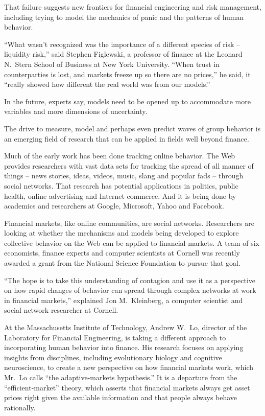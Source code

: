 ﻿\documentclass[12pt]{article}
\begin{document}
That failure suggests new frontiers for financial engineering and risk management, including trying
to model the mechanics of panic and the patterns of human behavior.

``What wasn't recognized was the importance of a different species of risk -- liquidity risk,'' said
Stephen Figlewski, a professor of finance at the Leonard N.~Stern School of Business at New York
University. ``When trust in counterparties is lost, and markets freeze up so there are no prices,''
he said, it ``really showed how different the real world was from our models.''

In the future, experts say, models need to be opened up to accommodate more variables and more
dimensions of uncertainty.

The drive to measure, model and perhaps even predict waves of group behavior is an emerging field of
research that can be applied in fields well beyond finance.

Much of the early work has been done tracking online behavior. The Web provides researchers with
vast data sets for tracking the spread of all manner of things -- news stories, ideas, videos,
music, slang and popular fads -- through social networks. That research has potential applications
in politics, public health, online advertising and Internet commerce. And it is being done by
academics and researchers at Google, Microsoft, Yahoo and Facebook.

Financial markets, like online communities, are social networks. Researchers are looking at whether
the mechanisms and models being developed to explore collective behavior on the Web can be applied
to financial markets. A team of six economists, finance experts and computer scientists at Cornell
was recently awarded a grant from the National Science Foundation to pursue that goal.

``The hope is to take this understanding of contagion and use it as a perspective on how rapid
changes of behavior can spread through complex networks at work in financial markets,'' explained
Jon M.~Kleinberg, a computer scientist and social network researcher at Cornell.

At the Massachusetts Institute of Technology, Andrew W.~Lo, director of the Laboratory for Financial
Engineering, is taking a different approach to incorporating human behavior into finance. His
research focuses on applying insights from disciplines, including evolutionary biology and cognitive
neuroscience, to create a new perspective on how financial markets work, which Mr.~Lo calls ``the
adaptive-markets hypothesis.'' It is a departure from the ``efficient-market'' theory, which asserts
that financial markets always get asset prices right given the available information and that people
always behave rationally.
\end{document}
